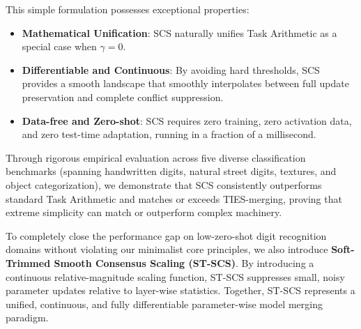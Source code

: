\documentclass{article}
\theoremstyle{plain}
\theoremstyle{definition}
\theoremstyle{remark}
\begin{document}
This simple formulation possesses exceptional properties:
\begin{itemize}
    \item \textbf{Mathematical Unification}: SCS naturally unifies Task Arithmetic as a special case when $\gamma = 0$.
    \item \textbf{Differentiable and Continuous}: By avoiding hard thresholds, SCS provides a smooth landscape that smoothly interpolates between full update preservation and complete conflict suppression.
    \item \textbf{Data-free and Zero-shot}: SCS requires zero training, zero activation data, and zero test-time adaptation, running in a fraction of a millisecond.
\end{itemize}

Through rigorous empirical evaluation across five diverse classification benchmarks (spanning handwritten digits, natural street digits, textures, and object categorization), we demonstrate that SCS consistently outperforms standard Task Arithmetic and matches or exceeds TIES-merging, proving that extreme simplicity can match or outperform complex machinery.

To completely close the performance gap on low-zero-shot digit recognition domains without violating our minimalist core principles, we also introduce \textbf{Soft-Trimmed Smooth Consensus Scaling (ST-SCS)}. By introducing a continuous relative-magnitude scaling function, ST-SCS suppresses small, noisy parameter updates relative to layer-wise statistics. Together, ST-SCS represents a unified, continuous, and fully differentiable parameter-wise model merging paradigm.
\end{document}
